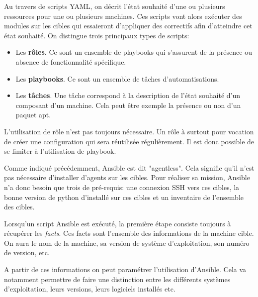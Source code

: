 \documentclass[12pt]{article}
\begin{document}
Au travers de scripts YAML, on décrit l'état souhaité d'une ou plusieurs ressources pour une ou plusieurs machines. 
Ces scripts vont alors exécuter des modules sur les cibles qui essaieront d'appliquer des correctifs afin d'atteindre cet état souhaité. 
On distingue trois principaux types de scripts:
\begin{itemize}
    \item Les \textbf{rôles}. Ce sont un ensemble de playbooks qui s'assurent de la présence ou absence de fonctionnalité spécifique.
    \item Les \textbf{playbooks}. Ce sont un ensemble de tâches d'automatisations.
    \item Les \textbf{tâches}. Une tâche correspond à la description de l'état souhaité d'un composant d'un machine. 
    Cela peut être exemple la présence ou non d'un paquet apt.
\end{itemize}

L'utilisation de rôle n'est pas toujours nécessaire. 
Un rôle à surtout pour vocation de créer une configuration qui sera réutilisée régulièrement. 
Il est donc possible de se limiter à l'utilisation de playbook.

Comme indiqué précédemment, \gls{Ansible} est dit "agentless". 
Cela signifie qu'il n'est pas nécessaire d'installer d'agents sur les cibles. 
Pour réaliser sa mission, \gls{Ansible} n'a donc besoin que trois de pré-requis:  une connexion SSH vers ces cibles, la bonne version de python d'installé sur ces cibles et un inventaire de l'ensemble des cibles.

Lorsqu'un script \gls{Ansible} est exécuté, la première étape consiste toujours à récupérer les \textit{facts}. 
Ces facts sont l'ensemble des informations de la machine cible. 
On aura le nom de la machine, sa version de système d'exploitation, son numéro de version, etc.

A partir de ces informations on peut paramétrer l'utilisation d'\gls{Ansible}. 
Cela va notamment permettre de faire une distinction entre les différents systèmes d'exploitation, leurs versions, leurs logiciels installés etc.
\end{document}
